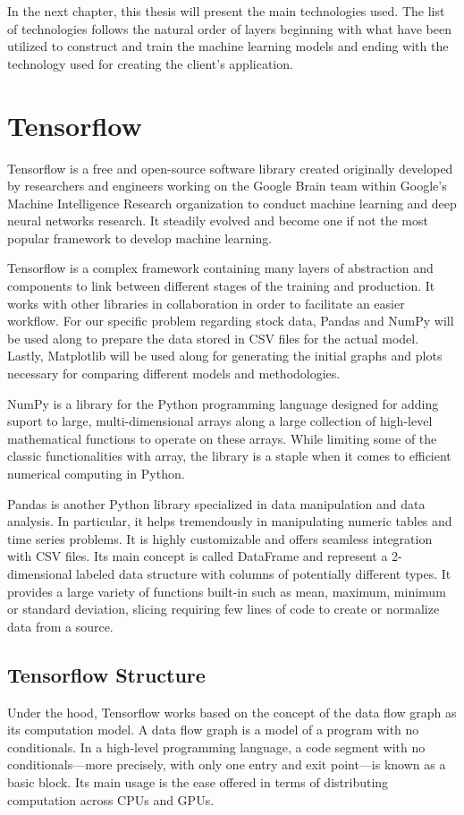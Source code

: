 In the next chapter, this thesis will present the main technologies used. The list of technologies follows the natural order of layers beginning with what have been utilized to construct and train the machine learning models and ending with the technology used for creating the client's application.

\section{Tensorflow}

Tensorflow is a free and open-source software library created originally developed by researchers and engineers working on the Google Brain team within Google's Machine Intelligence Research organization to conduct machine learning and deep neural networks research. It steadily evolved and become one if not the most popular framework to develop machine learning.

Tensorflow is a complex framework containing many layers of abstraction and components to link between different stages of the training and production. It works with other libraries in collaboration in order to facilitate an easier workflow. For our specific problem regarding stock data, Pandas and NumPy will be used along to prepare the data stored in CSV files for the actual model. Lastly, Matplotlib will be used along for generating the initial graphs and plots necessary for comparing different models and methodologies.

NumPy is a library for the Python programming language designed for adding suport to large, multi-dimensional arrays along a large collection of high-level mathematical functions to operate on these arrays. While limiting some of the classic functionalities with array, the library is a staple when it comes to efficient numerical computing in Python.

Pandas is another Python library specialized in data manipulation and data analysis. In particular, it helps tremendously in manipulating numeric tables and time series problems. It is highly customizable and offers seamless integration with CSV files. Its main concept is called DataFrame and represent a 2-dimensional labeled data structure with columns of potentially different types. It provides a large variety of functions built-in such as mean, maximum, minimum or standard deviation, slicing requiring few lines of code to create or normalize data from a source. 

\subsection*{Tensorflow Structure}
Under the hood, Tensorflow works based on the concept of the data flow graph as its computation model. A data flow graph is a model of a program with no conditionals. In a high-level programming language, a code segment with no conditionals—more precisely, with only one entry and exit point—is known as a basic block\cite{levitin2012introduction}. Its main usage is the ease offered in terms of distributing computation across CPUs and GPUs. 

